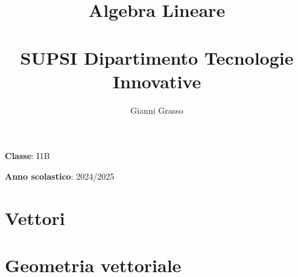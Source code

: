 \documentclass{article}
\title{
    Algebra Lineare \\
    \phantom{}\\
    \large SUPSI Dipartimento Tecnologie Innovative
}
\author{Gianni Grasso}
\begin{document}
\maketitle
\hphantom{ }
\vspace{14.5cm}

\textbf{Classe}: I1B

\textbf{Anno scolastico}: 2024/2025
\pagebreak


\tableofcontents
\pagebreak

\section{Vettori}

\pagebreak

\section{Geometria vettoriale}

\pagebreak
\end{document}
